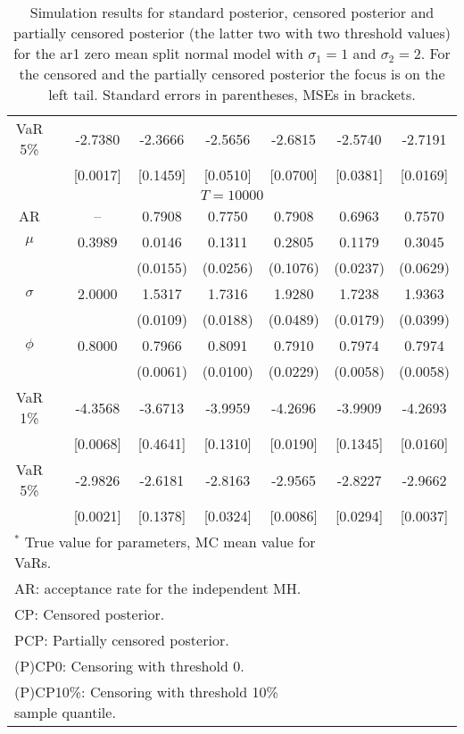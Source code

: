 {\begin{table}
\begin{tabular}{cc cccccc}
VaR 5\% && -2.7380 & -2.3666 & -2.5656 & -2.6815 & -2.5740 & -2.7191 \\ 
 && [0.0017] & [0.1459] & [0.0510] & [0.0700] & [0.0381] & [0.0169] \\ 
\hline 
\multicolumn{8}{c}{$T =10000$}  \\ 
\hline 
AR && -- & 0.7908 & 0.7750 & 0.7908 & 0.6963 & 0.7570 \\  
$\mu$&& 0.3989 & 0.0146 & 0.1311 & 0.2805 & 0.1179 & 0.3045 \\ 
&&   & (0.0155) & (0.0256) & (0.1076) & (0.0237) & (0.0629) \\ 
$\sigma$&& 2.0000 & 1.5317 & 1.7316 & 1.9280 & 1.7238 & 1.9363 \\ 
&&   & (0.0109) & (0.0188) & (0.0489) & (0.0179) & (0.0399) \\ 
$\phi$&& 0.8000 & 0.7966 & 0.8091 & 0.7910 & 0.7974 & 0.7974 \\ 
&&   & (0.0061) & (0.0100) & (0.0229) & (0.0058) & (0.0058) \\ 
VaR 1\% && -4.3568 & -3.6713 & -3.9959 & -4.2696 & -3.9909 & -4.2693 \\ 
  && [0.0068] & [0.4641] & [0.1310] & [0.0190] & [0.1345] & [0.0160] \\ 
VaR 5\% && -2.9826 & -2.6181 & -2.8163 & -2.9565 & -2.8227 & -2.9662 \\ 
 && [0.0021] & [0.1378] & [0.0324] & [0.0086] & [0.0294] & [0.0037] \\ 
\hline 
\multicolumn{6}{l}{\footnotesize{$^*$ True value for parameters, MC mean value for VaRs.}}  \\ 
\multicolumn{6}{l}{\footnotesize{AR: acceptance rate for the independent MH.}}  \\ 
\multicolumn{6}{l}{\footnotesize{CP: Censored posterior.}}  \\ 
\multicolumn{6}{l}{\footnotesize{PCP: Partially censored posterior.}} \\ 
\multicolumn{6}{l}{\footnotesize{(P)CP0: Censoring with threshold 0.}} \\ 
\multicolumn{6}{l}{\footnotesize{(P)CP10\%: Censoring with threshold 10\% sample quantile.}}  \\ 
\end{tabular}
 \caption{Simulation results for standard posterior, censored posterior and partially censored posterior (the latter two with two threshold values) for the ar1 zero mean split normal model with $\sigma_{1} = 1$ and $\sigma_{2} = 2$. For the censored and the partially censored posterior the focus is on the left tail. Standard errors in parentheses, MSEs in brackets.} 
\label{tab:ar1_pcp}  
\end{table}
}